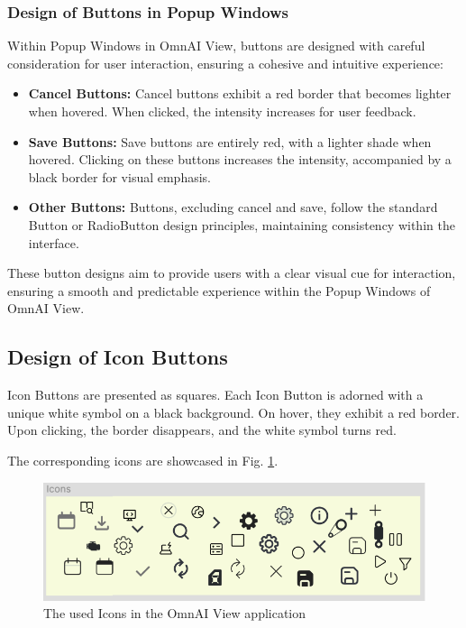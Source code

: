 \documentclass[]{scrreprt}
\begin{document}
\subsubsection{Design of Buttons in Popup Windows}

Within Popup Windows in OmnAI View, buttons are designed with careful consideration for user interaction, ensuring a cohesive and intuitive experience:

\begin{itemize}
    \item \textbf{Cancel Buttons:} Cancel buttons exhibit a red border that becomes lighter when hovered. When clicked, the intensity increases for user feedback.
    
    \item \textbf{Save Buttons:} Save buttons are entirely red, with a lighter shade when hovered. Clicking on these buttons increases the intensity, accompanied by a black border for visual emphasis.
    
    \item \textbf{Other Buttons:} Buttons, excluding cancel and save, follow the standard Button or RadioButton design principles, maintaining consistency within the interface.
\end{itemize}

These button designs aim to provide users with a clear visual cue for interaction, ensuring a smooth and predictable experience within the Popup Windows of OmnAI View.

\subsection{Design of Icon Buttons}

Icon Buttons are presented as squares. Each Icon Button is adorned with a unique white symbol on a black background. On hover, they exhibit a red border. Upon clicking, the border disappears, and the white symbol turns red.

The corresponding icons are showcased in Fig. \ref{fig: IconImages}.

\begin{figure}
    \includegraphics[width=.7\textwidth]{assets/pictures/Icons.png}
    \caption[]{The used Icons in the OmnAI View application}
    \label{fig: IconImages}
\end{figure}
\end{document}
